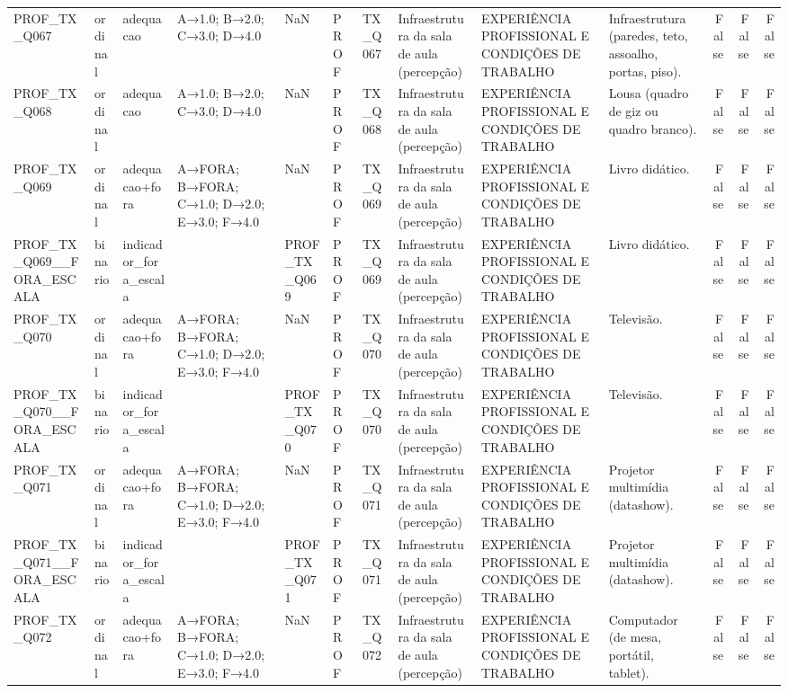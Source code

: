 \begin{tabular}{llllllllllrrr}
PROF\_TX\_Q067 & ordinal & adequacao & A→1.0; B→2.0; C→3.0; D→4.0 & NaN & PROF & TX\_Q067 & Infraestrutura da sala de aula (percepção) & EXPERIÊNCIA PROFISSIONAL E CONDIÇÕES DE TRABALHO & Infraestrutura (paredes, teto, assoalho, portas, piso). & False & False & False \\
PROF\_TX\_Q068 & ordinal & adequacao & A→1.0; B→2.0; C→3.0; D→4.0 & NaN & PROF & TX\_Q068 & Infraestrutura da sala de aula (percepção) & EXPERIÊNCIA PROFISSIONAL E CONDIÇÕES DE TRABALHO & Lousa (quadro de giz ou quadro branco). & False & False & False \\
PROF\_TX\_Q069 & ordinal & adequacao+fora & A→FORA; B→FORA; C→1.0; D→2.0; E→3.0; F→4.0 & NaN & PROF & TX\_Q069 & Infraestrutura da sala de aula (percepção) & EXPERIÊNCIA PROFISSIONAL E CONDIÇÕES DE TRABALHO & Livro didático. & False & False & False \\
PROF\_TX\_Q069\_\_FORA\_ESCALA & binario & indicador\_fora\_escala &  & PROF\_TX\_Q069 & PROF & TX\_Q069 & Infraestrutura da sala de aula (percepção) & EXPERIÊNCIA PROFISSIONAL E CONDIÇÕES DE TRABALHO & Livro didático. & False & False & False \\
PROF\_TX\_Q070 & ordinal & adequacao+fora & A→FORA; B→FORA; C→1.0; D→2.0; E→3.0; F→4.0 & NaN & PROF & TX\_Q070 & Infraestrutura da sala de aula (percepção) & EXPERIÊNCIA PROFISSIONAL E CONDIÇÕES DE TRABALHO & Televisão. & False & False & False \\
PROF\_TX\_Q070\_\_FORA\_ESCALA & binario & indicador\_fora\_escala &  & PROF\_TX\_Q070 & PROF & TX\_Q070 & Infraestrutura da sala de aula (percepção) & EXPERIÊNCIA PROFISSIONAL E CONDIÇÕES DE TRABALHO & Televisão. & False & False & False \\
PROF\_TX\_Q071 & ordinal & adequacao+fora & A→FORA; B→FORA; C→1.0; D→2.0; E→3.0; F→4.0 & NaN & PROF & TX\_Q071 & Infraestrutura da sala de aula (percepção) & EXPERIÊNCIA PROFISSIONAL E CONDIÇÕES DE TRABALHO & Projetor multimídia (datashow). & False & False & False \\
PROF\_TX\_Q071\_\_FORA\_ESCALA & binario & indicador\_fora\_escala &  & PROF\_TX\_Q071 & PROF & TX\_Q071 & Infraestrutura da sala de aula (percepção) & EXPERIÊNCIA PROFISSIONAL E CONDIÇÕES DE TRABALHO & Projetor multimídia (datashow). & False & False & False \\
PROF\_TX\_Q072 & ordinal & adequacao+fora & A→FORA; B→FORA; C→1.0; D→2.0; E→3.0; F→4.0 & NaN & PROF & TX\_Q072 & Infraestrutura da sala de aula (percepção) & EXPERIÊNCIA PROFISSIONAL E CONDIÇÕES DE TRABALHO & Computador (de mesa, portátil, tablet). & False & False & False \\

\end{tabular}
